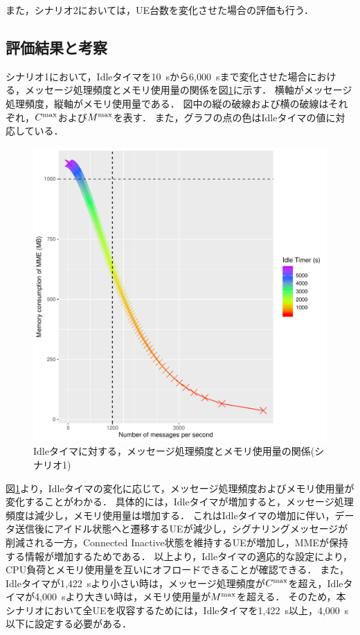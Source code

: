 \documentclass[technicalreport]{ieicej-rev}
\begin{document}
また，シナリオ2においては，UE台数を変化させた場合の評価も行う．

\subsection{評価結果と考察}
シナリオ1において，Idleタイマを10~sから6,000~sまで変化させた場合における，メッセージ処理頻度とメモリ使用量の関係を図\ref{theory_1_all_30s_theory}に示す．
横軸がメッセージ処理頻度，縦軸がメモリ使用量である．
図中の縦の破線および横の破線はそれぞれ，$C^{\rm max}$および$M^{\rm max}$を表す．
また，グラフの点の色はIdleタイマの値に対応している．
\begin{figure}[!t]
  \centering
  \includegraphics[width=1\hsize]{theory_1_all_30s_theory.pdf}
  \caption{Idleタイマに対する，メッセージ処理頻度とメモリ使用量の関係(シナリオ1)}
  \label{theory_1_all_30s_theory}
\end{figure}
図\ref{theory_1_all_30s_theory}より，Idleタイマの変化に応じて，メッセージ処理頻度およびメモリ使用量が変化することがわかる．
具体的には，Idleタイマが増加すると，メッセージ処理頻度は減少し，メモリ使用量は増加する．
これはIdleタイマの増加に伴い，データ送信後にアイドル状態へと遷移するUEが減少し，シグナリングメッセージが削減される一方，Connected Inactive状態を維持するUEが増加し，MMEが保持する情報が増加するためである．
以上より，Idleタイマの適応的な設定により，CPU負荷とメモリ使用量を互いにオフロードできることが確認できる．
また，Idleタイマが1,422~sより小さい時は，メッセージ処理頻度が$C^{\rm max}$を超え，Idleタイマが4,000~sより大きい時は，メモリ使用量が$M^{\rm max}$を超える．
そのため，本シナリオにおいて全UEを収容するためには，Idleタイマを1,422~s以上，4,000~s以下に設定する必要がある．
\end{document}
